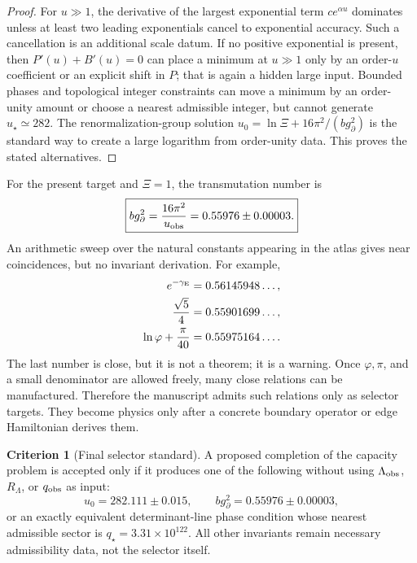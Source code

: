 \documentclass[aps,prd,reprint,nofootinbib,superscriptaddress,floatfix]{revtex4-2}
\numberwithin{equation}{section}
\theoremstyle{definition}
\newtheorem{criterion}{Criterion}[section]
\theoremstyle{plain}
\begin{document}
\begin{proof}
For \(u\gg1\), the derivative of the largest exponential term
\(c e^{\alpha u}\) dominates unless at least two leading exponentials cancel
to exponential accuracy.  Such a cancellation is an additional scale datum.
If no positive exponential is present, then \(P'(u)+B'(u)=0\) can place a
minimum at \(u\gg1\) only by an order-\(u\) coefficient or an explicit shift
in \(P\); that is again a hidden large input.  Bounded phases and topological
integer constraints can move a minimum by an order-unity amount or choose a
nearest admissible integer, but cannot generate \(u_\star\simeq282\).  The
renormalization-group solution \(u_0=\ln\Xi+16\pi^2/(b g_\partial^2)\) is the
standard way to create a large logarithm from order-unity data.  This proves
the stated alternatives.
\end{proof}

For the present target and \(\Xi=1\), the transmutation number is
\begin{equation}
\boxed{
b g_\partial^2=
\frac{16\pi^2}{u_{\rm obs}}
=0.55976\pm0.00003 .
}
\end{equation}
An arithmetic sweep over the natural constants appearing in the atlas gives
near coincidences, but no invariant derivation.  For example,
\begin{align}
e^{-\gamma_{\rm E}}&=0.56145948\ldots,\\
\frac{\sqrt5}{4}&=0.55901699\ldots,\\
\ln\varphi+\frac{\pi}{40}&=0.55975164\ldots .
\end{align}
The last number is close, but it is not a theorem; it is a warning.  Once
\(\varphi,\pi\), and a small denominator are allowed freely, many close
relations can be manufactured.  Therefore the manuscript admits such
relations only as selector targets.  They become physics only after a concrete
boundary operator or edge Hamiltonian derives them.

\begin{criterion}[Final selector standard]
A proposed completion of the capacity problem is accepted only if it produces
one of the following without using \(\Lambda_{\rm obs}\), \(R_\Lambda\), or
\(q_{\rm obs}\) as input:
\begin{equation}
\boxed{
u_0=282.111\pm0.015 ,
\qquad
b g_\partial^2=0.55976\pm0.00003 ,
}
\end{equation}
or an exactly equivalent determinant-line phase condition whose nearest
admissible sector is \(q_\star=3.31\times10^{122}\).  All other invariants
remain necessary admissibility data, not the selector itself.
\end{criterion}
\end{document}
